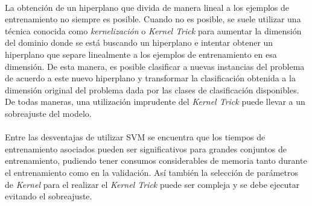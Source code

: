 \newpage %

\paragraph{}La obtención de un hiperplano que divida de manera lineal a los ejemplos de entrenamiento no siempre es posible.
Cuando no es posible, se suele utilizar una técnica conocida como \textit{kernelización} o \textit{Kernel Trick} para aumentar la dimensión del dominio donde se está buscando un hiperplano e intentar obtener un hiperplano que separe linealmente a los ejemplos de entrenamiento en esa dimensión.
De esta manera, es posible clasificar a nuevas instancias del problema de acuerdo a este nuevo hiperplano y transformar la clasificación obtenida a la dimensión original del problema dada por las clases de clasificación disponibles.
De todas maneras, una utilización imprudente del \textit{Kernel Trick} puede llevar a un sobreajuste del modelo.

\paragraph{}Entre las desventajas de utilizar SVM se encuentra que los tiempos de entrenamiento asociados pueden ser significativos para grandes conjuntos de entrenamiento, pudiendo tener consumos considerables de memoria tanto durante el entrenamiento como en la validación.
Así también la selección de parámetros de \textit{Kernel} para el realizar el \textit{Kernel Trick} puede ser compleja y se debe ejecutar evitando el sobreajuste.